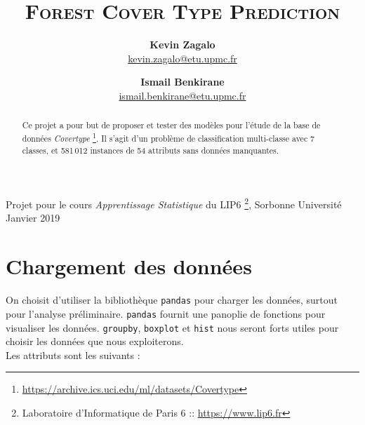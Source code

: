 \documentclass[12pt,a4paper]{article}
\title{\scshape \huge Forest Cover Type Prediction}
\author{\textbf{Kevin Zagalo} \\  \url{kevin.zagalo@etu.upmc.fr}  \and \textbf{Ismail Benkirane} \\ \url{ismail.benkirane@etu.upmc.fr}}
\date{}
\numberwithin{equation}{section}
\begin{document}
	\maketitle
	
{\small Projet pour le cours \textit{Apprentissage Statistique} du LIP6 \footnote[0]{Laboratoire d'Informatique de Paris 6 :: \url{https://www.lip6.fr}}, Sorbonne Université} \hfill Janvier 2019
	
	\hrulefill

	\begin{abstract}
		  Ce projet a pour but de proposer et tester des modèles pour l'étude de la base de données  \textit{Covertype} \footnote{\url{https://archive.ics.uci.edu/ml/datasets/Covertype}}. Il s'agit d'un problème de classification multi-classe avec 7 classes, et 581\,012 instances de 54 attributs sans données manquantes. 
	\end{abstract}

	\hrulefill

	\tableofcontents
	
	\newpage
	
	\section{Chargement des données}
	
	On choisit d'utiliser la bibliothèque \verb!pandas! pour charger les données, surtout pour l'analyse préliminaire. \verb!pandas! fournit une panoplie de fonctions pour visualiser les données. \verb!groupby!, \verb!boxplot! et \verb!hist! nous seront forts utiles pour choisir les données que nous exploiterons.\\
	
	Les attributs sont les suivants : 
	
\end{document}
